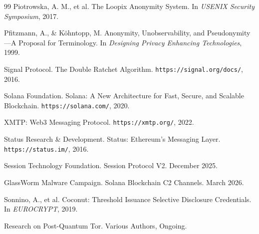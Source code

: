 \documentclass[11pt]{article}
\theoremstyle{definition}
\theoremstyle{remark}
\begin{document}
\begin{thebibliography}{99}
Piotrowska, A. M., et al.
\newblock The Loopix Anonymity System.
\newblock In \textit{USENIX Security Symposium}, 2017.

Pfitzmann, A., \& Köhntopp, M.
\newblock Anonymity, Unobservability, and Pseudonymity—A Proposal for Terminology.
\newblock In \textit{Designing Privacy Enhancing Technologies}, 1999.

Signal Protocol.
\newblock The Double Ratchet Algorithm.
\newblock \texttt{https://signal.org/docs/}, 2016.

Solana Foundation.
\newblock Solana: A New Architecture for Fast, Secure, and Scalable Blockchain.
\newblock \texttt{https://solana.com/}, 2020.

XMTP: Web3 Messaging Protocol.
\newblock \texttt{https://xmtp.org/}, 2022.

Status Research \& Development.
\newblock Status: Ethereum's Messaging Layer.
\newblock \texttt{https://status.im/}, 2016.

Session Technology Foundation.
\newblock Session Protocol V2.
\newblock December 2025.

GlassWorm Malware Campaign.
\newblock Solana Blockchain C2 Channels.
\newblock March 2026.

Sonnino, A., et al.
\newblock Coconut: Threshold Issuance Selective Disclosure Credentials.
\newblock In \textit{EUROCRYPT}, 2019.

Research on Post-Quantum Tor.
\newblock Various Authors, Ongoing.

\end{thebibliography}
\end{document}
